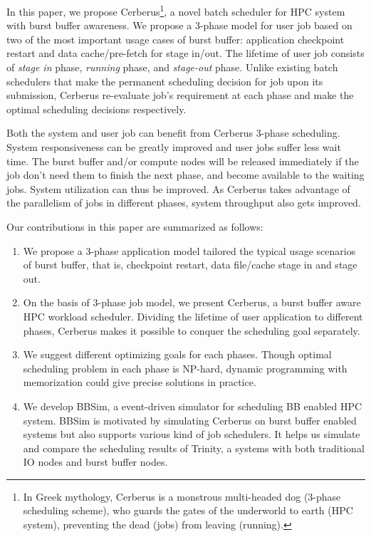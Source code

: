 In this paper, we propose Cerberus\footnote{In Greek mythology,
Cerberus is a monstrous multi-headed dog (3-phase scheduling scheme),
who guards the gates of the underworld to earth (HPC system),
preventing the dead (jobs) from leaving (running).},
a novel batch scheduler for HPC system with burst buffer awareness. 
We propose a 3-phase model for user job 
based on two of the most important usage cases of burst buffer: 
application checkpoint restart and data cache/pre-fetch for stage in/out. 
The lifetime of user job consists of \textit{stage in} phase, 
\textit{running} phase, and \textit{stage-out} phase. 
Unlike existing batch schedulers that 
make the permanent scheduling decision for job upon its submission, 
Cerberus re-evaluate job's requirement at each phase 
and make the optimal scheduling decisions respectively.

Both the system and user job can benefit from Cerberus 3-phase scheduling.
System responsiveness can be greatly improved and
user jobs suffer less wait time. 
The burst buffer and/or compute nodes will be released immediately
if the job don't need them to finish the next phase,
and become available to the waiting jobs.
System utilization can thus be improved.
As Cerberus takes advantage of the parallelism of jobs in different phases,
system throughput also gets improved.

Our contributions in this paper are summarized as follows:

\begin{enumerate}
        \item %
                We propose a 3-phase application model tailored the typical
                usage scenarios of burst buffer, that is, checkpoint restart,
                data file/cache stage in and stage out.
        \item On the basis of 3-phase job model, we present Cerberus,
                a burst buffer aware HPC workload scheduler.
                Dividing the lifetime of user application to different phases,
                Cerberus makes it possible to conquer the scheduling goal separately.
        \item We suggest different optimizing goals for each phases.
                Though optimal scheduling problem in each phase is NP-hard,
                dynamic programming with memorization could give precise solutions
                in practice.
        \item We develop BBSim, a event-driven simulator for scheduling
                BB enabled HPC system. BBSim is motivated by simulating Cerberus
                on burst buffer enabled systems but also supports various kind of job schedulers.
                It helps us simulate and compare the scheduling results of
                Trinity, a systems with both traditional IO nodes and burst buffer nodes.
\end{enumerate}

